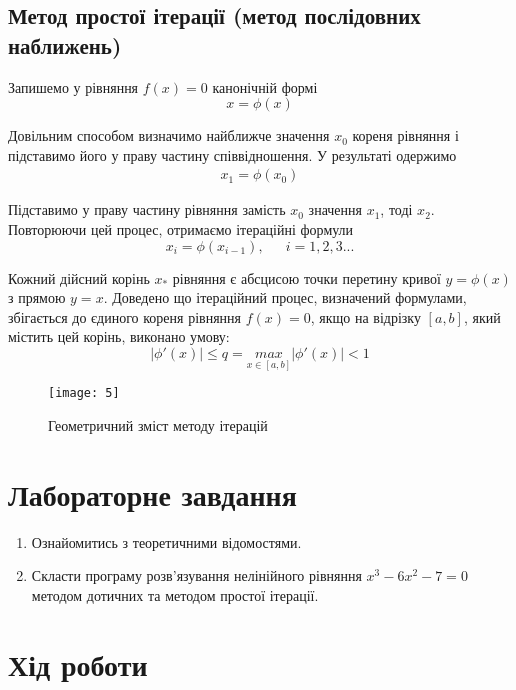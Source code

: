 \documentclass{article}
\begin{document}
\begin{large}
	\subsection*{Метод простої ітерації (метод послідовних наближень)}
	
	Запишемо у рівняння $f(x)=0$ канонічній формі
	\begin{equation}
		x=\phi(x)\nonumber
	\end{equation} 
	
	Довільним способом визначимо найближче значення $x_0$ кореня рівняння і підставимо його у праву частину співвідношення. У результаті одержимо
	\begin{eqnarray}
		x_1=\phi(x_0)\nonumber
	\end{eqnarray}

	Підставимо у праву частину рівняння замість $x_0$ значення $x_1$, тоді $x_2$. Повторюючи цей процес, отримаємо ітераційні формули
	\begin{equation}
		x_i = \phi(x_{i-1}), \hspace{18pt} i=1,2,3...\nonumber
	\end{equation}
	
	Кожний дійсний корінь $x_*$ рівняння є абсцисою точки перетину кривої $y=\phi(x)$ з прямою $y=x$. Доведено що ітераційний процес, визначений формулами, збігається до єдиного кореня
	рівняння $f(x)=0$, якщо на відрізку $[a,b]$, який містить цей корінь, виконано умову:
	\begin{equation}
		|\phi'(x)| \le q = \underset{x\in[a,b]}{max} |\phi'(x)|<1\nonumber
	\end{equation}
	
	\begin{figure}[h]
		\centering
		\texttt{[image: 5]}
		\captionsetup{justification=centering}
		\caption{Геометричний зміст методу ітерацій}
	\end{figure}
	
	\section*{Лабораторне завдання}
	\begin{enumerate}
		\item Ознайомитись з теоретичними відомостями.
		\item Скласти програму розв’язування нелінійного рівняння $x^3-6x^2-7=0$ методом дотичних та методом простої ітерації.
	\end{enumerate}
	
	\section*{Хід роботи}

\end{large}
\end{document}
